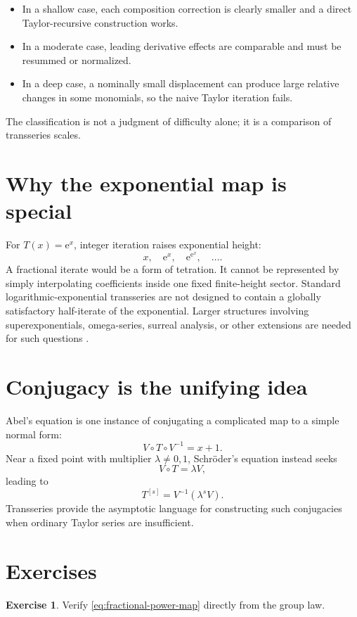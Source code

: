 \documentclass[11pt,openany]{book}
\theoremstyle{definition}
\newtheorem{exercise}{Exercise}[chapter]
\theoremstyle{plain}
\theoremstyle{remark}
\newcommand{\e}{\mathrm{e}}
\begin{document}
\begin{itemize}
\item In a shallow case, each composition correction is clearly smaller and a direct Taylor-recursive construction works.
\item In a moderate case, leading derivative effects are comparable and must be resummed or normalized.
\item In a deep case, a nominally small displacement can produce large relative changes in some monomials, so the naive Taylor iteration fails.
\end{itemize}

The classification is not a judgment of difficulty alone; it is a comparison of transseries scales.

\section{Why the exponential map is special}

For $T(x)=\e^x$, integer iteration raises exponential height:
\[
 x,\quad\e^x,\quad\e^{\e^x},\quad\ldots.
\]
A fractional iterate would be a form of tetration. It cannot be represented by simply interpolating coefficients inside one fixed finite-height sector. Standard logarithmic-exponential transseries are not designed to contain a globally satisfactory half-iterate of the exponential. Larger structures involving superexponentials, omega-series, surreal analysis, or other extensions are needed for such questions \cite{schmeling,berarducci-mantova-germs}.

\section{Conjugacy is the unifying idea}

Abel's equation is one instance of conjugating a complicated map to a simple normal form:
\[
 V\circ T\circ V^{-1}=x+1.
\]
Near a fixed point with multiplier $\lambda\ne0,1$, Schr\"oder's equation instead seeks
\[
 V\circ T=\lambda V,
\]
leading to
\[
 T^{[s]}=V^{-1}(\lambda^sV).
\]
Transseries provide the asymptotic language for constructing such conjugacies when ordinary Taylor series are insufficient.

\section{Exercises}

\begin{exercise}
Verify \cref{eq:fractional-power-map} directly from the group law.
\end{exercise}
\end{document}
